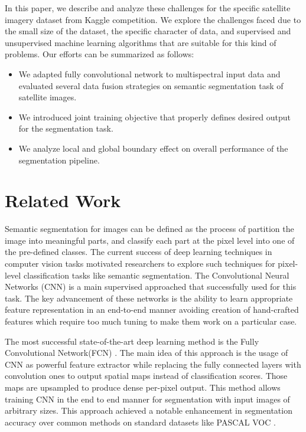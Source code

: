 \documentclass[10pt,twocolumn,letterpaper]{article}
\begin{document}
In this paper, we describe and analyze these challenges for the specific satellite imagery dataset from Kaggle competition.  We explore the challenges faced due to the small size of the dataset, the specific character of data, and supervised and unsupervised machine learning algorithms that are suitable for this kind of problems. Our efforts  can be summarized as follows: 
\begin{itemize}
\item We adapted fully convolutional network to multispectral input data and evaluated several data fusion strategies on semantic segmentation task of satellite images. 

\item We introduced joint training objective that properly defines desired output for the segmentation task.

\item We analyze local and global boundary effect on overall performance of the segmentation pipeline. 

\end{itemize} 


\section{Related Work}
\label{section:related_work}
Semantic segmentation for images can be defined as the process of partition the image into meaningful parts, and classify each part at the pixel level into one of the pre-defined classes. The current success of deep learning techniques in computer vision tasks motivated researchers to explore such techniques for pixel-level classification tasks like semantic segmentation. The Convolutional Neural Networks (CNN) is a main supervised approached that successfully used for this task. The key advancement of these networks is the ability to learn appropriate feature representation in an end-to-end manner avoiding creation of hand-crafted features which require too much tuning to make them work on a particular case.    

The most successful state-of-the-art deep learning method is the Fully Convolutional Network(FCN) \cite{fcn}.  The main idea of this approach is the usage of CNN as powerful feature extractor while replacing the fully connected layers with convolution ones to output spatial maps instead of classification scores. Those maps are upsampled to produce dense per-pixel output. This method allows training CNN in the end to end manner for segmentation with input images of arbitrary sizes. This approach achieved a notable enhancement in segmentation accuracy over common methods on standard datasets like PASCAL VOC \cite{pascal}.
\end{document}
